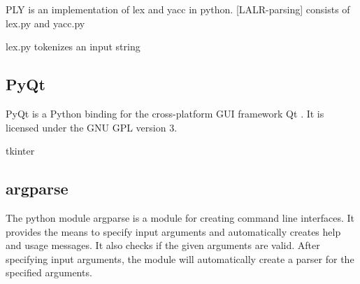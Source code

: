 \acf{PLY} \cite{PLY} is an implementation of lex and yacc in python.
[LALR-parsing]
consists of lex.py and yacc.py

lex.py tokenizes an input string\
\subsection{PyQt}\label{sec:BackgroundPytonPyQt}
PyQt is a Python binding for the cross-platform GUI framework Qt \cite{PyQt}.
It is licensed under the GNU GPL version 3.


tkinter
\subsection{argparse}\label{sec:BackgroundArgparse}
The python module argparse is a module for creating command line interfaces.
It provides the means to specify input arguments and \cite{argparse} automatically creates help and usage messages.
It also checks if the given arguments are valid.
After specifying input arguments, the module will automatically create a parser for the specified arguments.